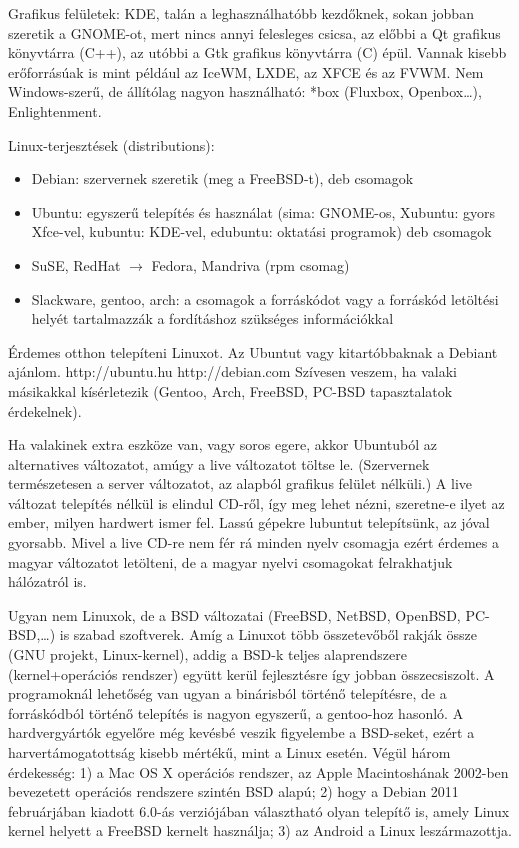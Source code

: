 \documentclass[a4paper]{article}
\begin{document}
Grafikus felületek: KDE, talán a leghasználhatóbb kezdőknek, sokan
jobban szeretik a GNOME-ot, mert nincs annyi felesleges csicsa, az
előbbi a Qt grafikus könyvtárra (C++), az utóbbi a Gtk grafikus
könyvtárra (C) épül. Vannak kisebb erőforrásúak is mint például az
IceWM, LXDE, az XFCE és az FVWM. Nem Windows-szerű, de állítólag nagyon
használható: *box (Fluxbox, Openbox\dots), Enlightenment.

Linux-terjesztések (distributions):
\begin{itemize}
\item Debian: szervernek szeretik (meg a FreeBSD-t), deb csomagok
\item Ubuntu: egyszerű telepítés és használat (sima: GNOME-os, Xubuntu:
	gyors Xfce-vel, kubuntu: KDE-vel, edubuntu: oktatási programok)
	deb csomagok
\item SuSE, RedHat $\rightarrow$ Fedora, Mandriva (rpm csomag)
\item Slackware, gentoo, arch: a csomagok a forráskódot vagy a forráskód
        letöltési helyét tartalmazzák a fordításhoz szükséges információkkal
\end{itemize}

Érdemes otthon telepíteni Linuxot. Az Ubuntut vagy kitartóbbaknak a
Debiant ajánlom.  http://ubuntu.hu http://debian.com Szívesen veszem, ha
valaki másikakkal kísérletezik (Gentoo, Arch, FreeBSD, PC-BSD
tapasztalatok érdekelnek).

Ha valakinek extra eszköze van, vagy soros egere, akkor Ubuntuból az
alternatives változatot, amúgy a live változatot töltse le. (Szervernek
természetesen a server változatot, az alapból grafikus felület nélküli.)
A live változat telepítés nélkül is elindul CD-ről, így meg lehet nézni,
szeretne-e ilyet az ember, milyen hardwert ismer fel. Lassú gépekre
lubuntut telepítsünk, az jóval gyorsabb. Mivel a live CD-re nem fér rá
minden nyelv csomagja ezért érdemes a magyar változatot letölteni, de
a magyar nyelvi csomagokat felrakhatjuk hálózatról is.

Ugyan nem Linuxok, de a BSD változatai (FreeBSD, NetBSD, OpenBSD,
PC-BSD,\ldots) is szabad szoftverek. Amíg a Linuxot több összetevőből
rakják össze (GNU projekt, Linux-kernel), addig a BSD-k teljes alaprendszere
(kernel+operációs rendszer) együtt kerül fejlesztésre így jobban
összecsiszolt. A programoknál lehetőség van ugyan a binárisból történő
telepítésre, de a forráskódból történő telepítés is nagyon egyszerű, a
gentoo-hoz hasonló. A hardvergyártók egyelőre még kevésbé veszik
figyelembe a BSD-seket, ezért a harvertámogatottság kisebb mértékű, mint
a Linux esetén. Végül három érdekesség: 1) a Mac OS X operációs rendszer, az
Apple Macintoshának 2002-ben bevezetett operációs rendszere szintén
BSD alapú; 2) hogy a Debian 2011 februárjában kiadott 6.0-ás
verziójában választható olyan telepítő is, amely Linux kernel helyett a
FreeBSD kernelt használja; 3) az Android a Linux leszármazottja.
\end{document}
